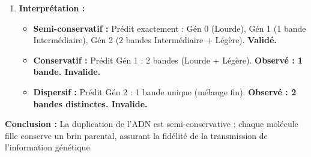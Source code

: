 \documentclass[11pt]{article}
\begin{document}
\begin{exoresolu}
\begin{enumerate}
\begin{itemize}
\begin{itemize}
                    \end{itemize}
                    \textbf{Deux bandes : 50\% Intermédiaire (HL) et 50\% Légère (LL).} \textit{(Conservatif : 25\% Lourde, 75\% Légère ; Dispersif : 1 bande intermédiaire plus légère que gén 1).}
            \end{itemize}
        \item \textbf{Interprétation :}
            \begin{itemize}
                \item \textbf{Semi-conservatif :} Prédit exactement : Gén 0 (Lourde), Gén 1 (1 bande Intermédiaire), Gén 2 (2 bandes Intermédiaire + Légère). \textbf{Validé.}
                \item \textbf{Conservatif :} Prédit Gén 1 : 2 bandes (Lourde + Légère). \textbf{Observé : 1 bande. Invalide.}
                \item \textbf{Dispersif :} Prédit Gén 2 : 1 bande unique (mélange fin). \textbf{Observé : 2 bandes distinctes. Invalide.}
            \end{itemize}
    \end{enumerate}
    \textbf{Conclusion :} La duplication de l'ADN est semi-conservative : chaque molécule fille conserve un brin parental, assurant la fidélité de la transmission de l'information génétique.
\end{exoresolu}
\end{document}
